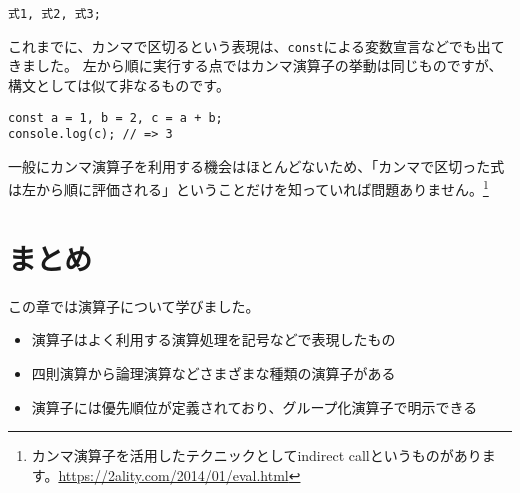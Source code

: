 \begin{lstlisting}
式1, 式2, 式3;
\end{lstlisting}

これまでに、カンマで区切るという表現は、\texttt{const}による変数宣言などでも出てきました。
左から順に実行する点ではカンマ演算子の挙動は同じものですが、構文としては似て非なるものです。

\begin{lstlisting}
const a = 1, b = 2, c = a + b;
console.log(c); // => 3
\end{lstlisting}

一般にカンマ演算子を利用する機会はほとんどないため、「カンマで区切った式は左から順に評価される」ということだけを知っていれば問題ありません。\footnote{カンマ演算子を活用したテクニックとしてindirect
  callというものがあります。\url{https://2ality.com/2014/01/eval.html}}

\hypertarget{conclusion}{%
\section{まとめ}\label{conclusion}}

この章では演算子について学びました。

\begin{itemize}
\item
  演算子はよく利用する演算処理を記号などで表現したもの
\item
  四則演算から論理演算などさまざまな種類の演算子がある
\item
  演算子には優先順位が定義されており、グループ化演算子で明示できる
\end{itemize}
